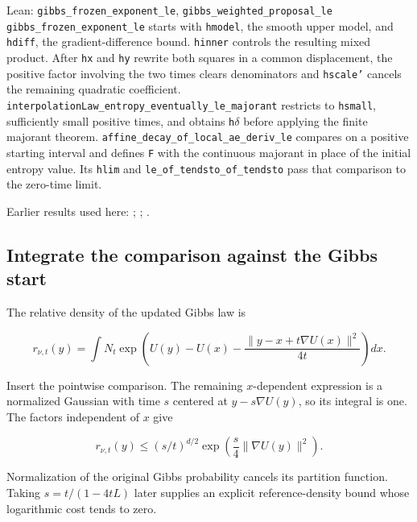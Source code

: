 \documentclass[11pt,a4paper]{report}
\begin{document}
\begin{leanbox}{Lean: \texttt{gibbs\_\allowbreak{}frozen\_\allowbreak{}exponent\_\allowbreak{}le}, \texttt{gibbs\_\allowbreak{}weighted\_\allowbreak{}proposal\_\allowbreak{}le}}
\texttt{gibbs\_\allowbreak{}frozen\_\allowbreak{}exponent\_\allowbreak{}le} starts with \texttt{hmodel}, the smooth upper model, and \texttt{hdiff}, the gradient-difference bound. \texttt{hinner} controls the resulting mixed product. After \texttt{hx} and \texttt{hy} rewrite both squares in a common displacement, the positive factor involving the two times clears denominators and \texttt{hscale'} cancels the remaining quadratic coefficient. \texttt{interpolation\allowbreak{}Law\_\allowbreak{}entropy\_\allowbreak{}eventually\_\allowbreak{}le\_\allowbreak{}majorant} restricts to \texttt{hsmall}, sufficiently small positive times, and obtains \texttt{h\ensuremath{\delta}} before applying the finite majorant theorem. \texttt{affine\_\allowbreak{}decay\_\allowbreak{}of\_\allowbreak{}local\_\allowbreak{}ae\_\allowbreak{}deriv\_\allowbreak{}le} compares on a positive starting interval and defines \texttt{F} with the continuous majorant in place of the initial entropy value. Its \texttt{hlim} and \texttt{le\_\allowbreak{}of\_\allowbreak{}tendsto\_\allowbreak{}of\_\allowbreak{}tendsto} pass that comparison to the zero-time limit.
\end{leanbox}


Earlier results used here: \cite[Section~3.37.12]{LangevinLean2026ULASC}; \cite[Section~3.37.14]{LangevinLean2026ULASC}; \cite[Section~3.9.1]{LangevinLean2026ULASC}.
\subsection{\texorpdfstring{Integrate the comparison against the Gibbs start}{Integrate the comparison against the Gibbs start}}
\label{report-step-UnadjustedLangevin-LSI-GibbsInterpolationBound-lean-3}


The relative density of the updated Gibbs law is

\[r_{\nu,t}(y)=\int N_t\exp\!\left(U(y)-U(x)-\frac{\|y-x+t\nabla U(x)\|^2}{4t}\right)dx.\]

Insert the pointwise comparison. The remaining \(x\)-dependent expression is a normalized Gaussian with time \(s\) centered at \(y-s\nabla U(y)\), so its integral is one. The factors independent of \(x\) give

\[r_{\nu,t}(y)\le(s/t)^{d/2}\exp\!\left(\frac s4\|\nabla U(y)\|^2\right).\]

Normalization of the original Gibbs probability cancels its partition function. Taking \(s=t/(1-4tL)\) later supplies an explicit reference-density bound whose logarithmic cost tends to zero.
\end{document}
